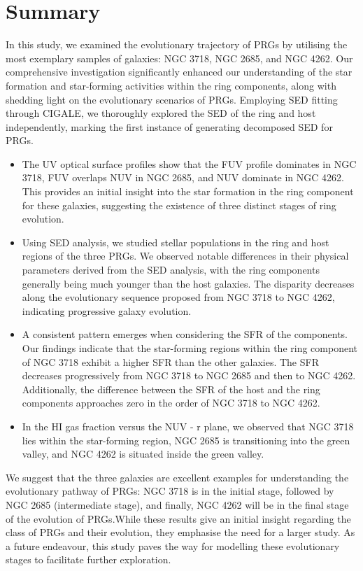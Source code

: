 \documentclass{pas}
\begin{document}
\section{Summary}
\label{sec:conclu}
In this study, we examined the evolutionary trajectory of PRGs by utilising the most exemplary samples of galaxies: NGC 3718, NGC 2685, and NGC 4262. Our comprehensive investigation significantly enhanced our understanding of the star formation and star-forming activities within the ring components, along with shedding light on the evolutionary scenarios of PRGs. Employing SED fitting through CIGALE, we thoroughly explored the SED of the ring and host independently, marking the first instance of generating decomposed SED for PRGs. 
\begin{itemize}    
    \item The UV optical surface profiles show that the FUV profile dominates in NGC 3718, FUV overlaps NUV in NGC 2685, and NUV dominate in NGC 4262. This provides an initial insight into the star formation in the ring component for these galaxies, suggesting the existence of three distinct stages of ring evolution.
    
    \item {Using SED analysis, we studied stellar populations in the ring and host regions of the three PRGs. We observed notable differences in their physical parameters derived from the SED analysis, with the ring components generally being much younger than the host galaxies. The disparity decreases along the evolutionary sequence proposed from NGC 3718 to NGC 4262, indicating progressive galaxy evolution.}
    
    \item {A consistent pattern emerges when considering the SFR of the components. Our findings indicate that the star-forming regions within the ring component of NGC 3718 exhibit a higher SFR than the other galaxies. The SFR decreases progressively from NGC 3718 to NGC 2685 and then to NGC 4262. Additionally, the difference between the SFR of the host and the ring components approaches zero in the order of NGC 3718 to NGC 4262.}
    
    \item In the HI gas fraction versus the NUV - r plane, we observed that NGC 3718 lies within the star-forming region, NGC 2685 is transitioning into the green valley, and NGC 4262 is situated inside the green valley.
\end{itemize}
We suggest that the three galaxies are excellent examples for understanding the evolutionary pathway of PRGs: NGC 3718 is in the initial stage, followed by NGC 2685  (intermediate stage), and finally, NGC 4262 will be in the final stage of the evolution of PRGs.While these results give an initial insight regarding the class of PRGs and their evolution, they emphasise the need for a larger study. As a future endeavour, this study paves the way for modelling these evolutionary stages to facilitate further exploration.
\end{document}
